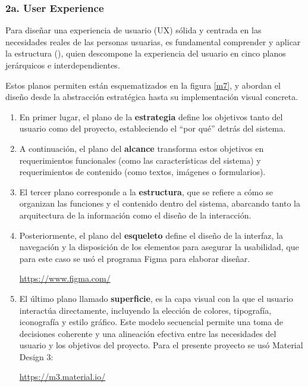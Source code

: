 \subsubsection{2a. User Experience}

Para diseñar una experiencia de usuario (UX) sólida y centrada en las necesidades reales de las personas usuarias, es fundamental comprender y aplicar la estructura (\cite{garrett2011elements}), quien descompone la experiencia del usuario en cinco planos jerárquicos e interdependientes. 

Estos planos permiten están esquematizados en la figura \ref{m7}, y abordan el diseño desde la abstracción estratégica hasta su implementación visual concreta. 

\begin{enumerate}
  \item En primer lugar, el plano de la \textbf{estrategia} define los objetivos tanto del usuario como del proyecto, estableciendo el ``por qué'' detrás del sistema. 
  
   \item A continuación, el plano del \textbf{alcance} transforma estos objetivos en requerimientos funcionales (como las características del sistema) y requerimientos de contenido (como textos, imágenes o formularios).

 \item El tercer plano corresponde a la \textbf{estructura}, que se refiere a cómo se organizan las funciones y el contenido dentro del sistema, abarcando tanto la arquitectura de la información como el diseño de la interacción. 
 
  \item Posteriormente, el plano del \textbf{esqueleto} define el diseño de la interfaz, la navegación y la disposición de los elementos para asegurar la usabilidad, que para este caso se usó el programa Figma para elaborar diseñar. 
  \begin{center}
    \url{https://www.figma.com/}
  \end{center}
  
   \item El último plano llamado \textbf{superficie}, es la capa visual con la que el usuario interactúa directamente, incluyendo la elección de colores, tipografía, iconografía y estilo gráfico. Este modelo secuencial permite una toma de decisiones coherente y una alineación efectiva entre las necesidades del usuario y los objetivos del proyecto. Para el presente proyecto se usó Material Design 3:
   \begin{center}
    \url{https://m3.material.io/}
   \end{center}
\end{enumerate}



